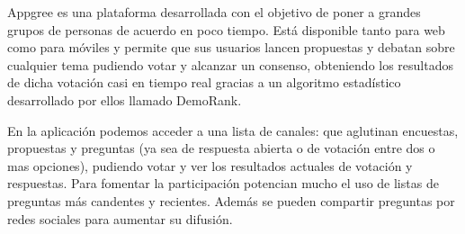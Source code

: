 Appgree\cite{ref:appgree} es una plataforma desarrollada con el objetivo de poner a grandes grupos de personas de acuerdo en poco tiempo. Está disponible tanto para web como para móviles y permite que sus usuarios lancen propuestas y debatan sobre cualquier tema pudiendo votar y alcanzar un consenso, obteniendo los resultados de dicha votación casi en tiempo real gracias a un algoritmo estadístico desarrollado por ellos llamado DemoRank\cite{ref:appgree_demoRank}.

En la aplicación podemos acceder a una lista de canales: que aglutinan encuestas, propuestas y preguntas (ya sea de respuesta abierta o de votación entre dos o mas opciones), pudiendo votar y ver los resultados actuales de votación y respuestas. Para fomentar la participación potencian mucho el uso de listas de preguntas más candentes y recientes. Además se pueden compartir preguntas por redes sociales para aumentar su difusión.

